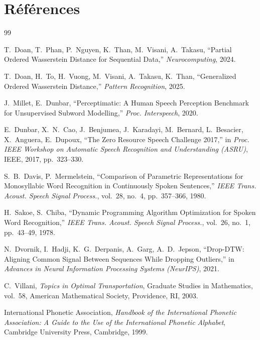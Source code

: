 \documentclass{article}
\begin{document}
\clearpage
\section*{Références}
\label{sec:refs}
\begin{thebibliography}{99}
\small
\setlength{\itemsep}{0pt}
\setlength{\parskip}{0pt}

T.~Doan, T.~Phan, P.~Nguyen, K.~Than, M.~Visani, A.~Takasu,
\enquote{Partial Ordered Wasserstein Distance for Sequential Data,}
\textit{Neurocomputing}, 2024.

T.~Doan, H.~To, H.~Vuong, M.~Visani, A.~Takasu, K.~Than,
\enquote{Generalized Ordered Wasserstein Distance,}
\textit{Pattern Recognition}, 2025.

J.~Millet, E.~Dunbar,
\enquote{Perceptimatic: A Human Speech Perception Benchmark for Unsupervised
Subword Modelling,}
\textit{Proc. Interspeech}, 2020.

E.~Dunbar, X.~N.~Cao, J.~Benjumea, J.~Karadayi, M.~Bernard,
L.~Besacier, X.~Anguera, E.~Dupoux,
\enquote{The Zero Resource Speech Challenge 2017,}
in \textit{Proc. IEEE Workshop on Automatic Speech Recognition and
Understanding (ASRU)}, IEEE, 2017, pp.~323--330.

S.~B.~Davis, P.~Mermelstein,
\enquote{Comparison of Parametric Representations for Monosyllabic Word
Recognition in Continuously Spoken Sentences,}
\textit{IEEE Trans. Acoust. Speech Signal Process.}, vol.~28, no.~4,
pp.~357--366, 1980.

H.~Sakoe, S.~Chiba,
\enquote{Dynamic Programming Algorithm Optimization for Spoken Word
Recognition,}
\textit{IEEE Trans. Acoust. Speech Signal Process.}, vol.~26, no.~1,
pp.~43--49, 1978.

N.~Dvornik, I.~Hadji, K.~G.~Derpanis, A.~Garg, A.~D.~Jepson,
\enquote{Drop-DTW: Aligning Common Signal Between Sequences While Dropping
Outliers,}
in \textit{Advances in Neural Information Processing Systems (NeurIPS)},
2021.

C.~Villani,
\textit{Topics in Optimal Transportation},
Graduate Studies in Mathematics, vol.~58,
American Mathematical Society, Providence, RI, 2003.

International Phonetic Association,
\textit{Handbook of the International Phonetic Association:
A Guide to the Use of the International Phonetic Alphabet},
Cambridge University Press, Cambridge, 1999.


\end{thebibliography}
\end{document}
